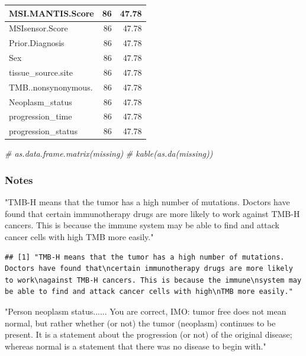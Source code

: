 \documentclass[
  11pt,
]{article}
\newenvironment{Shaded}{\begin{snugshade}}{\end{snugshade}}
\newcommand{\CommentTok}[1]{\textcolor[rgb]{0.56,0.35,0.01}{\textit{#1}}}
\newcommand{\StringTok}[1]{\textcolor[rgb]{0.31,0.60,0.02}{#1}}
\begin{document}
\begin{tabular}{l|r|r}
\hline
MSI.MANTIS.Score & 86 & 47.78\\
\hline
MSIsensor.Score & 86 & 47.78\\
\hline
Prior.Diagnosis & 86 & 47.78\\
\hline
Sex & 86 & 47.78\\
\hline
tissue\_source.site & 86 & 47.78\\
\hline
TMB..nonsynonymous. & 86 & 47.78\\
\hline
Neoplasm\_status & 86 & 47.78\\
\hline
progression\_time & 86 & 47.78\\
\hline
progression\_status & 86 & 47.78\\
\hline
\end{tabular}

\begin{Shaded}
\begin{Highlighting}[]
\CommentTok{\# as.data.frame.matrix(missing)}
\CommentTok{\# kable(as.da(missing))}
\end{Highlighting}
\end{Shaded}

\subsubsection{Notes}

\begin{Shaded}
\begin{Highlighting}[]
\StringTok{"TMB{-}H means that the tumor has a high number of mutations. Doctors have found that}
\StringTok{certain immunotherapy drugs are more likely to work}
\StringTok{against TMB{-}H cancers. This is because the immune}
\StringTok{system may be able to find and attack cancer cells with high}
\StringTok{TMB more easily."}
\end{Highlighting}
\end{Shaded}

\begin{verbatim}
## [1] "TMB-H means that the tumor has a high number of mutations. Doctors have found that\ncertain immunotherapy drugs are more likely to work\nagainst TMB-H cancers. This is because the immune\nsystem may be able to find and attack cancer cells with high\nTMB more easily."
\end{verbatim}

\begin{Shaded}
\begin{Highlighting}[]
\StringTok{"Person neoplasm status...... You are correct, IMO:  tumor free does not mean normal, but rather whether (or not) the tumor (neoplasm) continues to be present.  It is a statement about the progression (or not) of the original disease; whereas normal is a statement that there was no disease to begin with."}
\end{Highlighting}
\end{Shaded}
\end{document}
